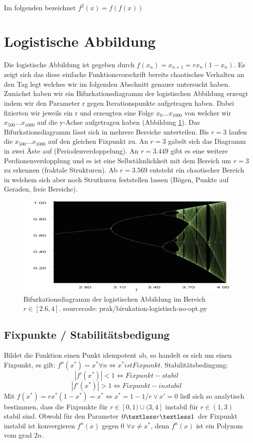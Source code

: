 \documentclass{scrartcl}
\begin{document}
Im folgenden bezeichnet $f^2(x) = f(f(x))$

\tableofcontents

\section{Logistische Abbildung}
Die logistische Abbildung ist gegeben durch $f(x_n)=x_{n+1}=rx_n(1-x_n)$. Es zeigt sich das diese einfache Funktionsvorschrift 
bereits chaotisches Verhalten an den Tag legt welches wir im folgenden Abschnitt genauer untersucht haben. Zunächst haben 
wir ein Bifurkationsdiagramm der logistischen Abbildung erzeugt indem wir den Parameter r gegen Iterationspunkte aufgetragen haben. Dabei fixierten wir jeweils ein r und erzeugten eine Folge $x_0 ... x_{1000}$ von welcher wir $x_{500} ... x_{1000}$ auf die y-Achse aufgetragen haben (Abbildung \ref{fig:bifurkation-sin-nice}).
Das Bifurkationsdiagramm lässt sich in mehrere Bereiche unterteilen. Bis $r=3$ laufen die $x_{500}...x_{1000}$ auf den gleichen Fixpunkt zu. An $r=3$ gabelt sich das Diagramm in zwei Äste auf (Periodenverdoppelung). An $r=3.449$ gibt es eine weitere Perdionenverdopplung und es ist eine Selbstähnlichkeit mit dem Bereich um $r=3$ zu erkennen (fraktale Strukturen). Ab $r=3.569$ entsteht ein chaotischer Bereich in welchem sich aber noch Strutkuren feststellen lassen (Bögen, Punkte auf Geraden, freie Bereiche).
\begin{figure}
	\centering
	\includegraphics[scale=0.30]{bifurkation}
	\caption{Bifurkationsdiagramm der logistischen Abbildung im Bereich $r\in[2.6,4]$. sourcecode: prak/birukation-logistisch-no-opt.py}
	\label{fig:bifurkation-sin-nice}
\end{figure}
\subsection{Fixpunkte / Stabilitätsbedigung}
Bildet die Funktion einen Punkt idempotent ab, so handelt es sich um einen Fixpunkt, es gilt: $f^n(x^*)=x^* \forall n \iff x^* ist Fixpunkt$. 
Stabilitätsbedingung:
$$|f'(x^*)|<1 \iff Fixpunkt-stabil$$
$$|f'(x^*)|>1 \iff Fixpunkt-instabil$$ Mit
\begin{math}
f(x^*)=rx^*(1-x^*)=x^*
\iff x^*=1-1/r \vee x'=0
\end{math}
ließ sich so analytisch bestimmen, dass die Fixpunkte für $r \in [0,1) \cup (3,4]$ instabil für $r \in (1,3)$ stabil sind.
Obwohl für den Parameter $0 \textless r \textless 1$ der Fixpunkt instabil ist konvergieren $f^n(x)$ gegen 0 $\forall x \neq x^*$, denn $f^n(x)$ ist ein Polynom vom grad $2n$. 
\end{document}
